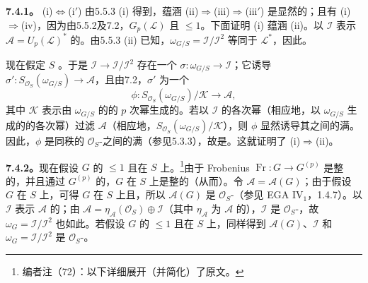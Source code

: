 \textbf{7.4.1。} (i)$\Leftrightarrow$(i$'$) 由5.5.3 (i) 得到，蕴涵 (ii)$\Rightarrow$(iii)$\Rightarrow$(iii$'$) 是显然的；且有 (i)$\Rightarrow$(iv)，因为由5.5.2及7.2，$G_p(\mathcal L)$ 且 $\le1$。下面证明 (i) 蕴涵 (ii)。以 $\mathcal I$ 表示 $\mathcal A=U_p(\mathcal L)^*$ 的。由5.5.3 (ii) 已知，$\omega_{G/S}=\mathcal I/\mathcal I^2$ 等同于 $\mathcal L^*$，因此。

现在假定 $S$ 。于是 $\mathcal I\to\mathcal I/\mathcal I^2$ 存在一个 $\sigma:\omega_{G/S}\to\mathcal I$；它诱导 $\sigma':S_{\mathcal O_S}(\omega_{G/S})\to\mathcal A$，且由7.2，$\sigma'$ 为一个
\[
 \phi:S_{\mathcal O_S}(\omega_{G/S})/\mathcal K\longrightarrow\mathcal A,
\]
其中 $\mathcal K$ 表示由 $\omega_{G/S}$ 的的 $p$ 次幂生成的。若以 $\mathcal I$ 的各次幂（相应地，以 $\omega_{G/S}$ 生成的的各次幂）过滤 $\mathcal A$（相应地，$S_{\mathcal O_S}(\omega_{G/S})/\mathcal K$），则 $\phi$ 显然诱导其之间的满。因此，$\phi$ 是同秩的 $\mathcal O_S$-之间的满（参见5.3.3），故是。这就证明了 (i)$\Rightarrow$(ii)。

\textbf{7.4.2。}现在假设 $G$ 的 $\le1$ 且在 $S$ 上。\footnote{编者注（72）：以下详细展开（并简化）了原文。}由于 Frobenius  $\operatorname{Fr}:G\to G^{(p)}$ 是整的，并且通过 $G^{(p)}$ 的，$G$ 在 $S$ 上是整的（从而）。令 $\mathcal A=\mathcal A(G)$；由于假设 $G$ 在 $S$ 上，可得 $G$ 在 $S$ 上且，所以 $\mathcal A(G)$ 是 $\mathcal O_S$-（参见 EGA IV$_1$，1.4.7）。以 $\mathcal I$ 表示 $\mathcal A$ 的；由 $\mathcal A=\eta_{\mathcal A}(\mathcal O_S)\oplus\mathcal I$（其中 $\eta_{\mathcal A}$ 为 $\mathcal A$ 的），$\mathcal I$ 是 $\mathcal O_S$-，故 $\omega_G=\mathcal I/\mathcal I^2$ 也如此。若假设 $G$ 的 $\le1$ 且在 $S$ 上，同样得到 $\mathcal A(G)$、$\mathcal I$ 和 $\omega_G=\mathcal I/\mathcal I^2$ 是 $\mathcal O_S$-。

